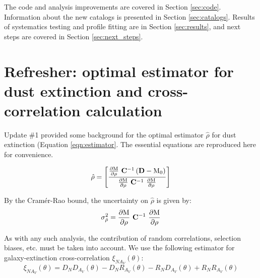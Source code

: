 \documentclass[11pt, oneside]{article}   	%
\newcommand{\dMdp}{\rm \frac{\partial M}{\partial \rho}}
\begin{document}
The code and analysis improvements are covered in Section \ref{sec:code}. Information about the new catalogs is presented in Section \ref{sec:catalogs}. Results of systematics testing and profile fitting are in Section \ref{sec:results}, and next steps are covered in Section \ref{sec:next_steps}. 
 

\section{Refresher: optimal estimator for dust extinction and cross-correlation calculation}\label{sec:theory}

Update \#1 provided some background for the optimal estimator $\hat{\rho}$ for dust extinction (Equation \ref{eqn:estimator}. The essential equations are reproduced here for convenience.

\begin{equation}
\hat{\rho} = \rm \left[ \frac{ \dMdp \ \mathbf{C}^{-1} \left (\mathbf{D} - M_0 \right )} {\dMdp\ \mathbf{C}^{-1 }\ \dMdp} \right ] \label{eqn:estimator}
\end{equation}

By the Cram\'{e}r-Rao bound, the uncertainty on $\hat{\rho}$ is given by:
\begin{equation}
\sigma^2_{\hat{\rho}} = \rm \dMdp\ \mathbf{C}^{-1 }\ \dMdp \label{eqn:RCO}
\end{equation}


As with any such analysis, the contribution of random correlations, selection biases, etc. must be taken into account. We use the following estimator for galaxy-extinction cross-correlation $\xi_{N A_V}(\theta)$:
\begin{equation}
\xi_{N A_V}(\theta) = D_N D_{A_V}(\theta) - D_N R_{A_V}(\theta) - R_N D_{A_V}(\theta) + R_N R_{A_V}(\theta)\label{eqn:xi_estimator}
\end{equation}
\end{document}
